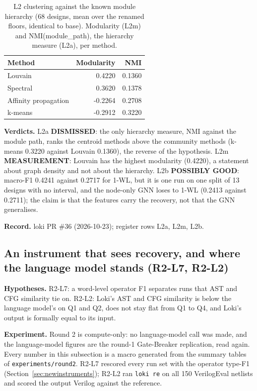 \documentclass[conference]{IEEEtran}
\newcommand{\verdict}[1]{\textbf{\textsc{#1}}}
\newcommand{\hev}[1]{\par\smallskip\noindent\textbf{#1}}
\newcommand{\code}[1]{\texttt{#1}}
\begin{document}
\begin{table}[t]
\caption{L2 clustering against the known module hierarchy (68 designs, mean over the
renamed floors, identical to base). Modularity (L2m) and NMI(module\_path), the hierarchy measure (L2a), per method.}
\label{tab:l2}
\centering
\footnotesize
\begin{tabular}{@{}lrr@{}}
\toprule
Method & Modularity & NMI \\
\midrule
Louvain & 0.4220 & 0.1360 \\
Spectral & 0.3620 & 0.1378 \\
Affinity propagation & -0.2264 & 0.2708 \\
k-means & -0.2912 & 0.3220 \\
\bottomrule
\end{tabular}
\end{table}

\hev{Verdicts.} L2a \verdict{DISMISSED}: the only hierarchy measure, NMI against the module path, ranks the
centroid methods above the community methods (k-means 0.3220 against Louvain 0.1360), the reverse of the
hypothesis. L2m \verdict{MEASUREMENT}: Louvain has the highest modularity (0.4220), a statement about graph
density and not about the hierarchy. L2b \verdict{POSSIBLY GOOD}: macro-F1 0.4241
against 0.2717 for 1-WL, but it is one run on one split of 13 designs with no interval, and the node-only GNN
loses to 1-WL (0.2413 against 0.2711); the claim is that the features carry the recovery, not that the
GNN generalises.


\hev{Record.} loki PR \#36 (2026-10-23); register rows L2a, L2m, L2b.

\subsection{An instrument that sees recovery, and where the language model stands (R2-L7, R2-L2)}
\label{sec:round2}

\hev{Hypotheses.} R2-L7: a word-level operator F1 separates runs that AST and CFG similarity tie on.
R2-L2: Loki's AST and CFG similarity is below the language model's on Q1 and Q2, does not stay flat
from Q1 to Q4, and Loki's output is formally equal to its input.

\hev{Experiment.} Round 2 is compute-only: no language-model call was made, and the
language-model figures are the round-1 Gate-Breaker replication, read again. Every number in this
subsection is a macro generated from the summary tables of \code{experiments/round2}. R2-L7 rescored every run set with the operator type-F1
(Section~\ref{sec:newinstruments}); R2-L2 ran \code{loki re} on all 150 VerilogEval netlists and
scored the output Verilog against the reference.
\end{document}
